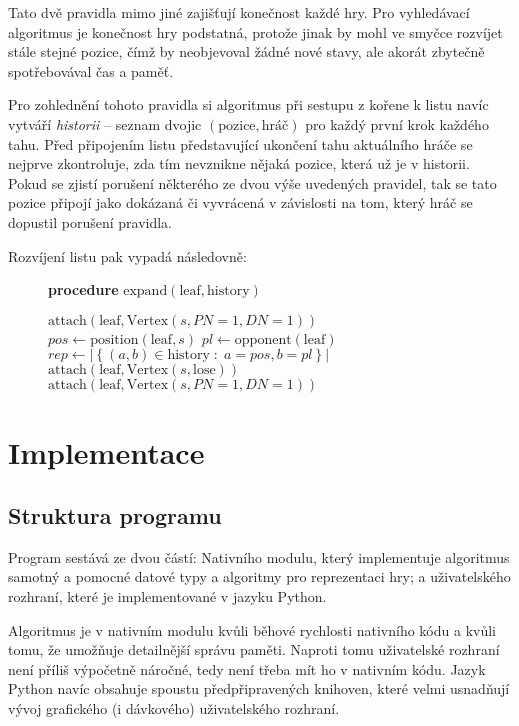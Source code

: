\documentclass{article}
\begin{document}
Tato dvě pravidla mimo jiné zajišťují konečnost každé hry. Pro vyhledávací algoritmus je konečnost hry podstatná,
protože jinak by mohl ve smyčce rozvíjet stále stejné pozice, čímž by neobjevoval žádné nové stavy, ale akorát zbytečně
spotřebovával čas a paměť.

Pro zohlednění tohoto pravidla si algoritmus při sestupu z kořene k listu navíc vytváří \emph{historii} -- seznam dvojic
$(\text{pozice}, \text{hráč})$ pro každý první krok každého tahu. Před připojením listu představující ukončení tahu
aktuálního hráče se nejprve zkontroluje, zda tím nevznikne nějaká pozice, která už je v historii. Pokud se zjistí
porušení některého ze dvou výše uvedených pravidel, tak se tato pozice připojí jako dokázaná či vyvrácená v závislosti
na tom, který hráč se dopustil porušení pravidla.

Rozvíjení listu pak vypadá následovně:
\begin{figure}[H]
{\bf procedure} $\text{expand}(\text{leaf}, \text{history})$
\begin{algorithmic}
		\STATE $\text{attach}(\text{leaf}, \text{Vertex}(s, PN=1, DN=1))$
	\ELSE
		\STATE $pos \gets \text{position}(\text{leaf}, s)$
		\STATE $pl \gets \text{opponent}(\text{leaf})$
		\STATE $rep \gets \left|\left\{ (a, b) \in \text{history} \;:\; a = pos, b = pl \right\}\right|$
			\STATE $\text{attach}(\text{leaf}, \text{Vertex}(s, \text{lose}))$
		\ELSE
			\STATE $\text{attach}(\text{leaf}, \text{Vertex}(s, PN=1, DN=1))$
		\ENDIF
	\ENDIF
\ENDFOR
\end{algorithmic}
\end{figure}

\section{Implementace}
\subsection{Struktura programu}
Program sestává ze dvou částí: Nativního modulu, který implementuje algoritmus samotný a pomocné datové typy a algoritmy
pro reprezentaci hry; a uživatelského rozhraní, které je implementované v jazyku Python.

Algoritmus je v nativním modulu kvůli běhové rychlosti nativního kódu a kvůli tomu, že umožňuje detailnější správu
paměti. Naproti tomu uživatelské rozhraní není příliš výpočetně náročné, tedy není třeba mít ho v nativním kódu. Jazyk
Python navíc obsahuje spoustu předpřipravených knihoven, které velmi usnadňují vývoj grafického (i dávkového)
uživatelského rozhraní.
\end{document}
